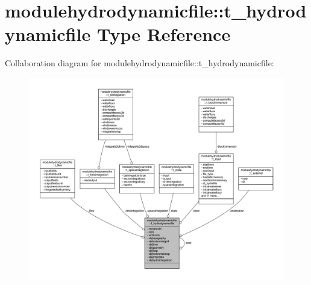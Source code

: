 \hypertarget{structmodulehydrodynamicfile_1_1t__hydrodynamicfile}{}\section{modulehydrodynamicfile\+:\+:t\+\_\+hydrodynamicfile Type Reference}
\label{structmodulehydrodynamicfile_1_1t__hydrodynamicfile}


Collaboration diagram for modulehydrodynamicfile\+:\+:t\+\_\+hydrodynamicfile\+:\nopagebreak
\begin{figure}[H]
\begin{center}
\leavevmode
\includegraphics[width=350pt]{structmodulehydrodynamicfile_1_1t__hydrodynamicfile__coll__graph}
\end{center}
\end{figure}
